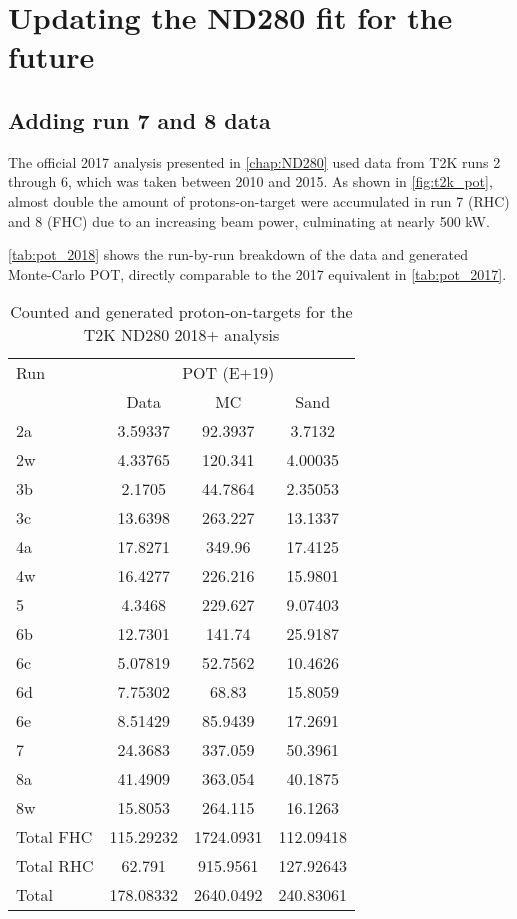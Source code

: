 \chapter{Updating the ND280 fit for the future}

\section{Adding run 7 and 8 data}
The official 2017 analysis presented in \autoref{chap:ND280} used data from T2K runs 2 through 6, which was taken between 2010 and 2015. As shown in \autoref{fig:t2k_pot}, almost double the amount of protons-on-target were accumulated in run 7 (RHC) and 8 (FHC) due to an increasing beam power, culminating at nearly 500 kW.

\autoref{tab:pot_2018} shows the run-by-run breakdown of the data and generated Monte-Carlo POT, directly comparable to the 2017 equivalent in \autoref{tab:pot_2017}.
\begin{table}[h]
	\centering
	\begin{tabular}{ l c c c }
		\hline
		\hline
		Run &  \multicolumn{3}{c}{POT (E+19)} \\
		    & 	Data & MC & Sand \\
		\hline
		2a  & 3.59337    & 92.3937     & 3.7132  \\
		2w  & 4.33765    & 120.341     & 4.00035 \\
		\hline
		3b  & 2.1705     & 44.7864     & 2.35053 \\
		3c  & 13.6398    & 263.227     & 13.1337 \\
		\hline
		4a  & 17.8271    & 349.96      & 17.4125 \\
		4w  & 16.4277    & 226.216     & 15.9801 \\
		\hline
		5   & 4.3468     & 229.627     & 9.07403 \\
		\hline
		6b  & 12.7301    & 141.74      & 25.9187 \\
		6c  & 5.07819    & 52.7562     & 10.4626 \\
		6d  & 7.75302    & 68.83       & 15.8059 \\
		6e  & 8.51429    & 85.9439     & 17.2691 \\
		\hline
		7   & 24.3683	 & 337.059     & 50.3961 \\
		\hline
		8a  & 41.4909	 & 363.054	   & 40.1875 \\
		8w  & 15.8053    & 264.115 	   & 16.1263 \\
		\hline
		Total FHC & 115.29232 & 1724.0931 &  112.09418 \\
		Total RHC & 62.791 	  & 915.9561  &  127.92643 \\
		\hline
		Total 	  & 178.08332 & 2640.0492 &  240.83061 \\
		\hline
		\hline
	\end{tabular}
	\caption{Counted and generated proton-on-targets for the T2K ND280 2018+ analysis}
	\label{tab:pot_2018}
\end{table}

